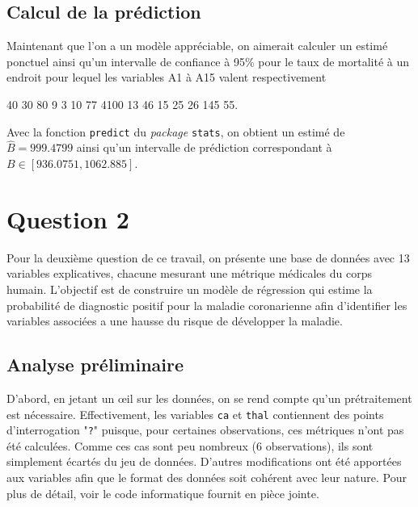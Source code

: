 \documentclass{article}
\begin{document}
	\subsection{Calcul de la prédiction}
	Maintenant que l'on a un modèle appréciable, on aimerait calculer un estimé ponctuel ainsi qu’un intervalle de confiance à 95\% pour le taux de mortalité à un endroit pour lequel les variables A1 à A15 valent respectivement
	\begin{center}
		40 30 80 9 3 10 77 4100 13 46 15 25 26 145 55.
	\end{center}
	Avec la fonction \texttt{predict} du \textit{package} \texttt{stats}, on obtient un estimé de $\hat{B} = 999.4799$ ainsi qu'un intervalle de prédiction correspondant à  $B \in [936.0751, 1062.885]$.
	
\section{Question 2}
	Pour la deuxième question de ce travail, on présente une base de données avec 13 variables explicatives, chacune mesurant une métrique médicales du corps humain. L'objectif est de construire un modèle de régression qui estime la probabilité de diagnostic positif pour la maladie coronarienne afin d'identifier les variables associées a une hausse du risque de développer la maladie.
	
	\subsection{Analyse préliminaire}
	D'abord, en jetant un œil sur les données, on se rend compte qu'un prétraitement est nécessaire. Effectivement, les variables \texttt{ca} et \texttt{thal} contiennent des points d'interrogation "\texttt{?}" puisque, pour certaines observations, ces métriques n'ont pas été calculées. Comme ces cas sont peu nombreux (6 observations), ils sont simplement écartés du jeu de données. D'autres modifications ont été apportées aux variables afin que le format des données soit cohérent avec leur nature. Pour plus de détail, voir le code informatique fournit en pièce jointe.
	
	
\end{document}
